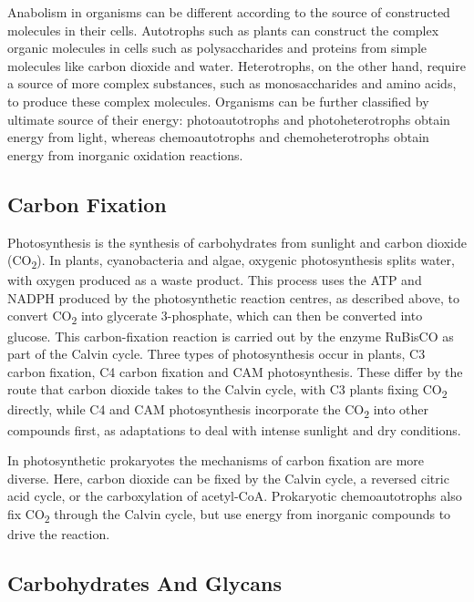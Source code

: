 Anabolism in organisms can be different according to the source of constructed molecules in their cells. Autotrophs such as plants can construct the complex organic molecules in cells such as polysaccharides and proteins from simple molecules like carbon dioxide and water. Heterotrophs, on the other hand, require a source of more complex substances, such as monosaccharides and amino acids, to produce these complex molecules. Organisms can be further classified by ultimate source of their energy: photoautotrophs and photoheterotrophs obtain energy from light, whereas chemoautotrophs and chemoheterotrophs obtain energy from inorganic oxidation reactions.

\hypertarget{carbon-fixation}{%
\subsection{Carbon Fixation}\label{carbon-fixation}}

Photosynthesis is the synthesis of carbohydrates from sunlight and carbon dioxide (CO\textsubscript{2}). In plants, cyanobacteria and algae, oxygenic photosynthesis splits water, with oxygen produced as a waste product. This process uses the ATP and NADPH produced by the photosynthetic reaction centres, as described above, to convert CO\textsubscript{2} into glycerate 3-phosphate, which can then be converted into glucose. This carbon-fixation reaction is carried out by the enzyme RuBisCO as part of the Calvin cycle. Three types of photosynthesis occur in plants, C3 carbon fixation, C4 carbon fixation and CAM photosynthesis. These differ by the route that carbon dioxide takes to the Calvin cycle, with C3 plants fixing CO\textsubscript{2} directly, while C4 and CAM photosynthesis incorporate the CO\textsubscript{2} into other compounds first, as adaptations to deal with intense sunlight and dry conditions.

In photosynthetic prokaryotes the mechanisms of carbon fixation are more diverse. Here, carbon dioxide can be fixed by the Calvin cycle, a reversed citric acid cycle, or the carboxylation of acetyl-CoA. Prokaryotic chemoautotrophs also fix CO\textsubscript{2} through the Calvin cycle, but use energy from inorganic compounds to drive the reaction.

\hypertarget{carbohydrates-and-glycans}{%
\subsection{Carbohydrates And Glycans}\label{carbohydrates-and-glycans}}

